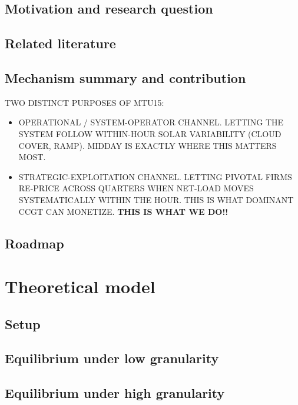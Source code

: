 \documentclass[11pt,a4paper]{article}
\begin{document}
\subsection{Motivation and research question}

\subsection{Related literature}

\subsection{Mechanism summary and contribution}

TWO DISTINCT PURPOSES OF MTU15:
\begin{itemize}
       \item OPERATIONAL / SYSTEM-OPERATOR CHANNEL. LETTING THE SYSTEM FOLLOW WITHIN-HOUR SOLAR VARIABILITY (CLOUD COVER, RAMP). MIDDAY IS EXACTLY WHERE THIS MATTERS MOST.
       \item STRATEGIC-EXPLOITATION CHANNEL. LETTING PIVOTAL FIRMS RE-PRICE ACROSS QUARTERS WHEN NET-LOAD MOVES SYSTEMATICALLY WITHIN THE HOUR. THIS IS WHAT DOMINANT CCGT CAN MONETIZE. \textbf{THIS IS WHAT WE DO!!}
\end{itemize}

\subsection{Roadmap}


\section{Theoretical model}\label{sec:model}

\subsection{Setup}

\subsection{Equilibrium under low granularity}

\subsection{Equilibrium under high granularity}
\end{document}

